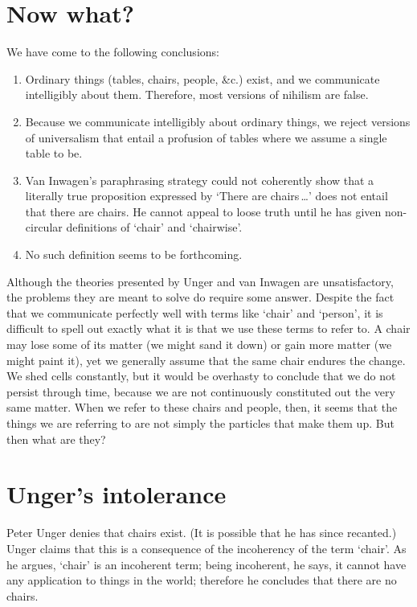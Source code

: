 \documentclass[11pt]{article}
\begin{document}
\begin{spacing}{1}
\hline

\section{Now what?}
We have come to the following conclusions:
\begin{enumerate}
	\item Ordinary things (tables, chairs, people, \&c.) exist,
          and we communicate intelligibly about them.  Therefore, most
          versions of nihilism are false.
	\item Because we communicate intelligibly about ordinary
          things, we reject versions of universalism that entail a
          profusion of tables where we assume a single table to be.
	\item Van Inwagen's paraphrasing strategy could not coherently
          show that a literally true proposition expressed by `There
          are chairs\,\ldots ' does not entail that there are chairs.
          He cannot appeal to loose truth until he has given
          non-circular definitions of `chair' and `chairwise'.
	\item No such definition seems to be forthcoming.
\end{enumerate}

Although the theories presented by Unger and van Inwagen are
unsatisfactory, the problems they are meant to solve do require some
answer.  Despite the fact that we communicate perfectly well with
terms like `chair' and `person', it is difficult to spell out exactly
what it is that we use these terms to refer to.  A chair may lose some
of its matter (we might sand it down) or gain more matter (we might
paint it), yet we generally assume that the same chair endures the
change.  We shed cells constantly, but it would be overhasty to
conclude that we do not persist through time, because we are not
continuously constituted out the very same matter.  When we refer to
these chairs and people, then, it seems that the things we are
referring to are not simply the particles that make them up.  But then
what are they?

\hline

\section{Unger's intolerance}
\noindent Peter Unger denies that chairs exist.  (It is possible that
he has since recanted.)  Unger claims that this is a consequence of
the incoherency of the term `chair'.  As he argues, `chair' is an
incoherent term; being incoherent, he says, it cannot have any
application to things in the world; therefore he concludes that there
are no chairs.


\end{spacing}
\end{document}
